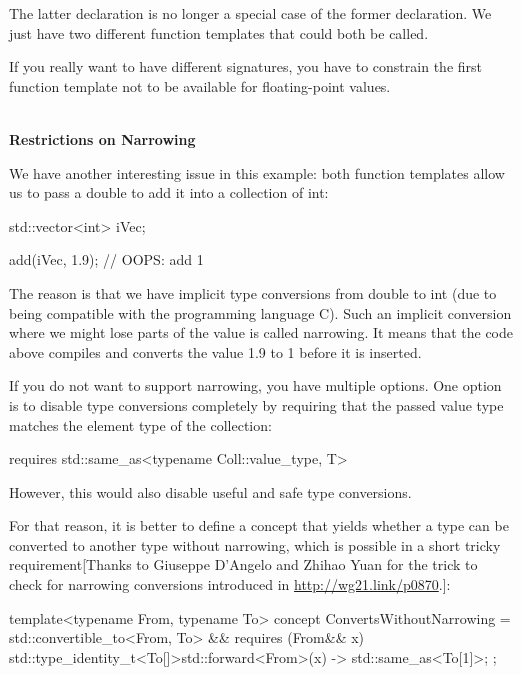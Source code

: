The latter declaration is no longer a special case of the former declaration. We just have two different function templates that could both be called.

If you really want to have different signatures, you have to constrain the first function template not to be available for floating-point values.

\noindent
\hspace*{\fill} \\ %
\textbf{Restrictions on Narrowing}

We have another interesting issue in this example: both function templates allow us to pass a double to add it into a collection of int:

\begin{cpp}
std::vector<int> iVec;

add(iVec, 1.9); // OOPS: add 1
\end{cpp}

The reason is that we have implicit type conversions from double to int (due to being compatible with the programming language C). Such an implicit conversion where we might lose parts of the value is called narrowing. It means that the code above compiles and converts the value 1.9 to 1 before it is inserted.

If you do not want to support narrowing, you have multiple options. One option is to disable type conversions completely by requiring that the passed value type matches the element type of the collection:

\begin{cpp}
requires std::same_as<typename Coll::value_type, T>
\end{cpp}

However, this would also disable useful and safe type conversions.

For that reason, it is better to define a concept that yields whether a type can be converted to another type without narrowing, which is possible in a short tricky requirement[Thanks to Giuseppe D’Angelo and Zhihao Yuan for the trick to check for narrowing conversions introduced in \url{http://wg21.link/p0870}.]:

\begin{cpp}
template<typename From, typename To>
concept ConvertsWithoutNarrowing =
	std::convertible_to<From, To> &&
	requires (From&& x) {
		{ std::type_identity_t<To[]>{std::forward<From>(x)} }
		-> std::same_as<To[1]>;
	};
\end{cpp}

